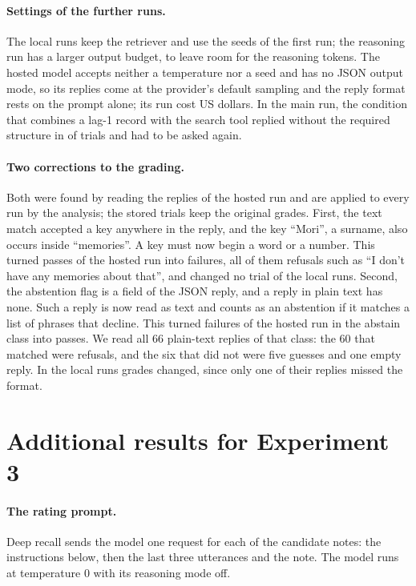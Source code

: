 \documentclass[10pt]{article}
\begin{document}
\paragraph{Settings of the further runs.} The local runs keep the retriever and use the seeds of the first run; the reasoning run has a larger output budget, to leave room for the reasoning tokens. The hosted model accepts neither a temperature nor a seed and has no JSON output mode, so its replies come at the provider's default sampling and the reply format rests on the prompt alone; its run cost \HsCostRun{} US dollars. In the main run, the condition that combines a lag-1 record with the search tool replied without the required structure in \RepairedHyb{} of \EtwoPerCondition{} trials and had to be asked again.

\paragraph{Two corrections to the grading.} Both were found by reading the replies of the hosted run and are applied to every run by the analysis; the stored trials keep the original grades. First, the text match accepted a key anywhere in the reply, and the key ``Mori'', a surname, also occurs inside ``memories''. A key must now begin a word or a number. This turned \HsRegradedRecall{} passes of the hosted run into failures, all of them refusals such as ``I don't have any memories about that'', and changed no trial of the local runs. Second, the abstention flag is a field of the JSON reply, and a reply in plain text has none. Such a reply is now read as text and counts as an abstention if it matches a list of phrases that decline. This turned \HsRegradedAbstain{} failures of the hosted run in the abstain class into passes. We read all 66 plain-text replies of that class: the 60 that matched were refusals, and the six that did not were five guesses and one empty reply. In the local runs \RegradedAbstain{} grades changed, since only one of their replies missed the format.

\section{Additional results for Experiment 3}
\label{app:slow}

\paragraph{The rating prompt.} Deep recall sends the model one request for each of the \SCandidates{} candidate notes: the instructions below, then the last three utterances and the note. The model runs at temperature 0 with its reasoning mode off.
\end{document}
